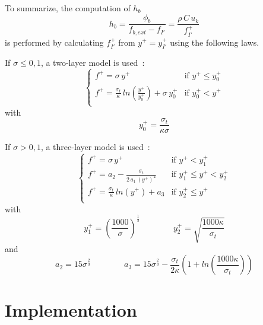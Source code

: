 \newpage
To summarize, the computation of $h_b$
\begin{equation}
h_b=\displaystyle\frac{\phi_b}{f_{b,ext}-f_{I'}}=\frac{\rho\,C\,u_k}{f^+_{I'}}
\end{equation}
is performed by calculating  $f^+_{I'}$ from $y^+=y^+_{I'}$
using the following laws.

If $\sigma\leqslant 0,1$, a two-layer model is used~:
\begin{equation}
\left\{
\begin{array}{ll}
f^+ = \sigma \,y^+ & \text{if } y^+ \leqslant y^+_0 \\
f^+ = \displaystyle\frac{\sigma_t}{\kappa}\,
        ln\left(\displaystyle\frac{y^+}{y^+_0}\right)+\sigma \,y^+_0
                   & \text{if } y^+_0 < y^+\\
\end{array}
\right.
\end{equation}
with
\begin{equation}
y^+_0= \displaystyle\frac{\sigma_t}{\kappa\sigma}
\end{equation}


If $\sigma > 0,1$, a three-layer model is used~:
\begin{equation}
\left\{
\begin{array}{ll}
f^+ = \sigma \,y^+ & \text{if } y^+ < y^+_1 \\
f^+ = a_2 -\displaystyle\frac{\sigma_t}{2\,a_1\,(y^+)^2}& \text{if } y_1^+ \leqslant y^+ < y_2^+ \\
f^+ = \displaystyle\frac{\sigma_t}{\kappa}\,ln(y^+)+a_3& \text{if } y^+_2 \leqslant y^+\\
\end{array}
\right.
\end{equation}
with
\begin{equation}
  y^+_1 =\left(\displaystyle\frac{1000}{\sigma}\right)^\frac{1}{3} \qquad\qquad
  y^+_2 = \sqrt{\displaystyle\frac{1000\kappa}{\sigma_t}}
\end{equation}
and
\begin{equation}
a_2=15\sigma^{\frac{2}{3}}\qquad\qquad
a_3=15\sigma^{\frac{2}{3}}-\displaystyle\frac{\sigma_t}{2\kappa}
\left(1+
ln\left(\displaystyle\frac{1000\kappa}{\sigma_t}\right)\right)
\end{equation}

\section{Implementation}

